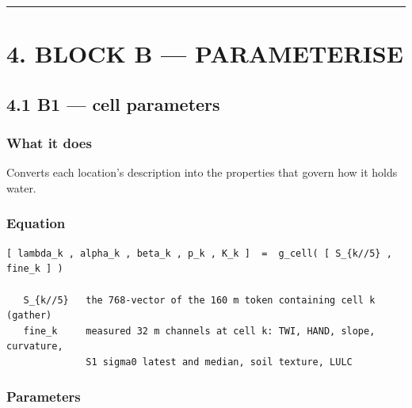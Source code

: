\documentclass[10pt,a4paper]{article}
\begin{document}
\medskip\hrule\medskip

\section*{4. BLOCK B — PARAMETERISE}

\subsection*{4.1 B1 — cell parameters}

\subsubsection*{What it does}

Converts each location's description into the properties that govern how it
holds water.

\subsubsection*{Equation}

\begin{Verbatim}[fontsize=\scriptsize,frame=leftline,framerule=0.6pt,rulecolor=\color{rulegray},xleftmargin=6pt,framesep=6pt,]
   [ lambda_k , alpha_k , beta_k , p_k , K_k ]  =  g_cell( [ S_{k//5} , fine_k ] )

   S_{k//5}   the 768-vector of the 160 m token containing cell k   (gather)
   fine_k     measured 32 m channels at cell k: TWI, HAND, slope, curvature,
              S1 sigma0 latest and median, soil texture, LULC
\end{Verbatim}

\subsubsection*{Parameters}
\end{document}
